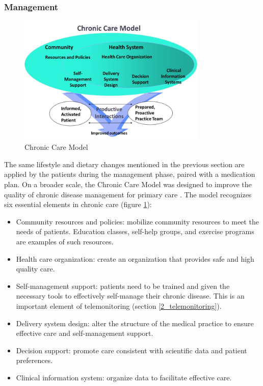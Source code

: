         \subsubsection{Management}

        \begin{figure}[!t]
            \centering
            \includegraphics[width=0.8\textwidth]{chapters/2_background/chronic_model}
            \caption{Chronic Care Model}\label{fig:chronic_care}
        \end{figure}

        The same lifestyle and dietary changes mentioned in the previous section are applied by the patients during the management phase, paired with a medication plan. On a broader scale, the Chronic Care Model was designed to improve the quality of chronic disease management for primary care \cite{bodenheimer2002improving}. The model recognizes six essential elements in chronic care (figure \ref{fig:chronic_care}):
        \begin{itemize}
            \item Community resources and policies: mobilize community resources to meet the needs of patients. Education classes, self-help groups, and exercise programs are examples of such resources.
            \item Health care organization: create an organization that provides safe and high quality care. 
            \item Self-management support: patients need to be trained and given the necessary tools to effectively self-manage their chronic disease. This is an important element of telemonitoring (section \ref{2_telemonitoring}).
            \item Delivery system design: alter the structure of the medical practice to ensure effective care and self-management support.
            \item Decision support: promote care consistent with scientific data and patient preferences.
            \item Clinical information system: organize data to facilitate effective care.
        \end{itemize}

